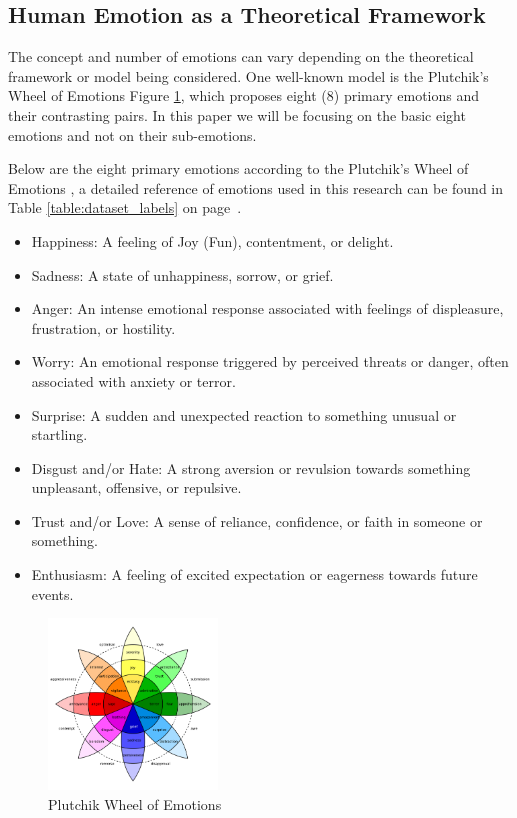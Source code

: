 \documentclass[11pt]{article}
\begin{document}
\subsection{Human Emotion as a Theoretical Framework}

The concept and number of emotions can vary depending on the theoretical framework or model being considered. One well-known model is the Plutchik's Wheel of Emotions Figure \ref{fig:plutchik-wheel}, which proposes eight (8) primary emotions and their contrasting pairs. In this paper we will be focusing on the basic eight emotions and not on their sub-emotions.

Below are the eight primary emotions according to the Plutchik's Wheel of Emotions \cite{Tromp}, a detailed reference of emotions used in this research can be found in Table \ref{table:dataset_labels} on page~\pageref{table:dataset_labels}.

\begin{itemize}
\item Happiness: A feeling of Joy (Fun), contentment, or delight.
\item Sadness: A state of unhappiness, sorrow, or grief.
\item Anger: An intense emotional response associated with feelings of displeasure, frustration, or hostility.
\item Worry: An emotional response triggered by perceived threats or danger, often associated with anxiety or terror.
\item Surprise: A sudden and unexpected reaction to something unusual or startling.
\item Disgust and/or Hate: A strong aversion or revulsion towards something unpleasant, offensive, or repulsive.
\item Trust and/or Love: A sense of reliance, confidence, or faith in someone or something.
\item Enthusiasm: A feeling of excited expectation or eagerness towards future events.
\end{itemize}

\begin{figure}[h]
    \centering
    \includegraphics[width=0.4\textwidth]{Plutchik-Wheel}
    \caption{Plutchik Wheel of Emotions}
    \label{fig:plutchik-wheel}
\end{figure}
\end{document}
